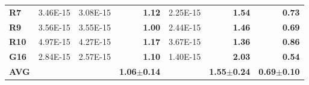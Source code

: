 \documentclass[encoding=utf8,british]{tumphthesis}
\begin{document}
\begin{table}[H]
\begin{subtable}{1.0\textwidth}
{\begin{tabular}{|l|llr|lr|r|}
\textbf{R7}                               & 3.46E-15                                             & 3.08E-15                                              & \textbf{1.12}                                    & 2.25E-15                                                       & \textbf{1.54}                                    & \textbf{0.73}                                            \\
\rowcolor[HTML]{CFE2F3} 
\textbf{R9}                               & 3.56E-15                                             & 3.55E-15                                              & \textbf{1.00}                                    & 2.44E-15                                                       & \textbf{1.46}                                    & \textbf{0.69}                                            \\
\textbf{R10}                              & 4.97E-15                                             & 4.27E-15                                              & \textbf{1.17}                                    & 3.67E-15                                                       & \textbf{1.36}                                    & \textbf{0.86}                                            \\
\rowcolor[HTML]{CFE2F3} 
\textbf{G16}                              & 2.84E-15                                             & 2.57E-15                                              & \textbf{1.10}                                    & 1.40E-15                                                       & \textbf{2.03}                                    & \textbf{0.54}                                            \\ \hline
\textbf{AVG}                             &                                                      &                                                       & \textbf{1.06$\pm$0.14}                           &                                                                & \textbf{1.55$\pm$0.24}                           & \textbf{0.69$\pm$0.10}                                  
 \\ \hline
\end{tabular}}
    \end{subtable}

    \bigskip
    \hfill


\end{table}
\end{document}
